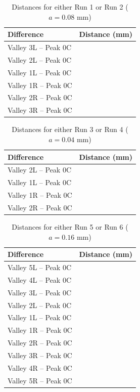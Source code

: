\begin{table}[ht!]
    \centering
    \begin{tabular}{|l|r|}
        \hline
        Difference & Distance (mm) \\
        \hline
        Valley 3L -- Peak 0C & \\
        Valley 2L -- Peak 0C & \\
        Valley 1L -- Peak 0C & \\
        \hline
        Valley 1R -- Peak 0C & \\
        Valley 2R -- Peak 0C & \\
        Valley 3R -- Peak 0C & \\
        \hline
    \end{tabular}
    \caption{Distances for either Run 1 or Run 2 ($a = 0.08$ mm)}
    \label{tablel.11.dis.12}
\end{table}
\begin{table}[ht!]
    \centering
    \begin{tabular}{|l|r|}
        \hline
        Difference & Distance (mm) \\
        \hline
        Valley 2L -- Peak 0C & \\
        Valley 1L -- Peak 0C & \\
        \hline
        Valley 1R -- Peak 0C & \\
        Valley 2R -- Peak 0C & \\
        \hline
    \end{tabular}
    \caption{Distances for either Run 3 or Run 4 ($a = 0.04$ mm)}
    \label{tablel.11.dis.34}
\end{table}
\begin{table}[ht!]
    \centering
    \begin{tabular}{|l|r|}
        \hline
        Difference & Distance (mm) \\
        \hline
        Valley 5L -- Peak 0C & \\
        Valley 4L -- Peak 0C & \\
        Valley 3L -- Peak 0C & \\
        Valley 2L -- Peak 0C & \\
        Valley 1L -- Peak 0C & \\
        \hline
        Valley 1R -- Peak 0C & \\
        Valley 2R -- Peak 0C & \\
        Valley 3R -- Peak 0C & \\
        Valley 4R -- Peak 0C & \\
        Valley 5R -- Peak 0C & \\
        \hline
    \end{tabular}
    \caption{Distances for either Run 5 or Run 6 ($a = 0.16$ mm)}
    \label{tablel.11.dis.56}
\end{table}
